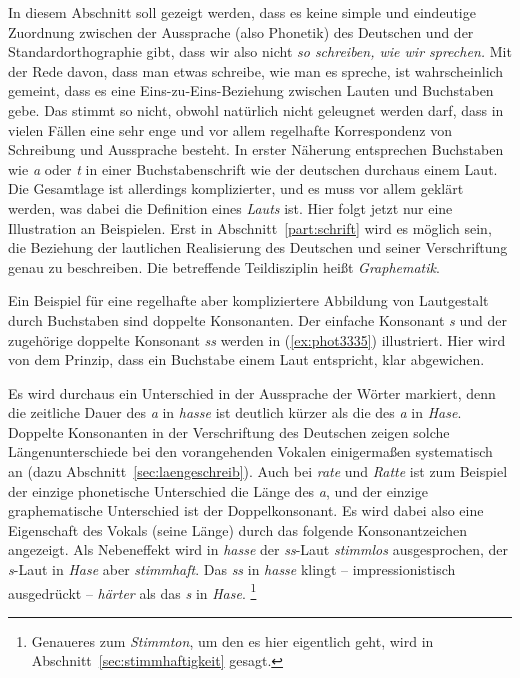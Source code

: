 \label{sec:orthographiegraphematik}


In diesem Abschnitt soll gezeigt werden, dass es keine simple und eindeutige Zuordnung zwischen der Aussprache (also Phonetik) des Deutschen und der Standardorthographie gibt, dass wir also nicht \textit{so schreiben, wie wir sprechen.}
Mit der Rede davon, dass man etwas schreibe, wie man es spreche, ist wahrscheinlich gemeint, dass es eine Eins-zu-Eins-Beziehung zwischen Lauten und Buchstaben gebe. 
Das stimmt so nicht, obwohl natürlich nicht geleugnet werden darf, dass in vielen Fällen eine sehr enge und vor allem regelhafte Korrespondenz von Schreibung und Aussprache besteht.
In erster Näherung entsprechen Buchstaben wie \textit{a} oder \textit{t} in einer Buchstabenschrift wie der deutschen durchaus einem Laut. 
Die Gesamtlage ist allerdings komplizierter, und es muss vor allem geklärt werden, was dabei die Definition eines \textit{Lauts} ist.  
Hier folgt jetzt nur eine Illustration an Beispielen.
Erst in Abschnitt~\ref{part:schrift} wird es möglich sein, die Beziehung der lautlichen Realisierung des Deutschen und seiner Verschriftung genau zu beschreiben.
Die betreffende Teildisziplin heißt \textit{Graphematik}.

Ein Beispiel für eine regelhafte aber kompliziertere Abbildung von Lautgestalt durch Buchstaben sind doppelte Konsonanten.
Der einfache Konsonant \textit{s} und der zugehörige doppelte Konsonant \textit{ss} werden in (\ref{ex:phot3335}) illustriert.
Hier wird von dem Prinzip, dass ein Buchstabe einem Laut entspricht, klar abgewichen.

\begin{exe}
  \ex\label{ex:phot3335}
  \begin{xlist}
  \end{xlist}
\end{exe}

Es wird durchaus ein Unterschied in der Aussprache der Wörter markiert, denn die zeitliche Dauer des \textit{a} in \textit{hasse} ist deutlich kürzer als die des \textit{a} in \textit{Hase}.
Doppelte Konsonanten in der Verschriftung des Deutschen zeigen solche Längenunterschiede bei den vorangehenden Vokalen einigermaßen systematisch an (dazu Abschnitt~\ref{sec:laengeschreib}).
Auch bei \textit{rate} und \textit{Ratte} ist zum Beispiel der einzige phonetische Unterschied die Länge des \textit{a}, und der einzige graphematische Unterschied ist der Doppelkonsonant.
Es wird dabei also eine Eigenschaft des Vokals (seine Länge) durch das folgende Konsonantzeichen angezeigt.
Als Nebeneffekt wird in \textit{hasse} der \textit{ss}-Laut \textit{stimmlos} ausgesprochen, der \textit{s}-Laut in \textit{Hase} aber \textit{stimmhaft}.
Das \textit{ss} in \textit{hasse} klingt -- impressionistisch ausgedrückt -- \textit{härter} als das \textit{s} in \textit{Hase}.%
\footnote{Genaueres zum \textit{Stimmton}, um den es hier eigentlich geht, wird in Abschnitt~\ref{sec:stimmhaftigkeit} gesagt.}

